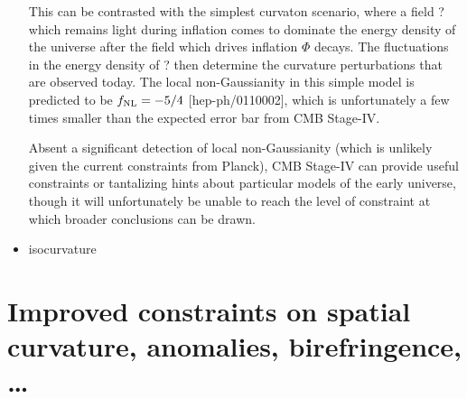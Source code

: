 \begin{itemize}
This can be contrasted with the simplest curvaton scenario, where a field ? which remains light during inflation comes to dominate the energy density of the universe after the field which drives inflation $\Phi$ decays. The fluctuations in the energy density of ? then determine the curvature perturbations that are observed today. The local non-Gaussianity in this simple model is predicted to be $f_{\rm NL} = -5/4$ [hep-ph/0110002], which is unfortunately a few times smaller than the expected error bar from CMB Stage-IV.

Absent a significant detection of local non-Gaussianity (which is unlikely given the current constraints from Planck), CMB Stage-IV can provide useful constraints or tantalizing hints about particular models of the early universe, though it will unfortunately be unable to reach the level of constraint at which broader conclusions can be drawn. 
\item isocurvature
\end{itemize}



\section{Improved constraints on spatial curvature, anomalies, birefringence, \dots}
\label{sec:speculative}




